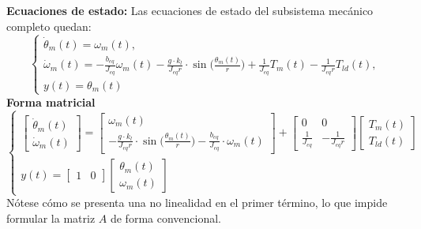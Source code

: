 \documentclass[12pt, a4paper,journal, onecolumn, compsoc]{IEEEtran}
\begin{document}
    \textbf{Ecuaciones de estado:} Las ecuaciones de estado del subsistema mecánico completo quedan:
    \begin{equation}
        \begin{cases}
            \dot \theta_m(t) = \omega_m(t), \\ 
            \dot\omega_m(t)=-\frac{b_{eq}}{J_{eq}}\omega_m(t)-\frac{g\cdot k_l}{J_{eq}r}\cdot \sin{\Big(\frac{\theta_m(t)}{r}\Big)}+\frac{1}{J_{eq}}T_m(t)-\frac{1}{J_{eq}r}T_{ld}(t),\\
            y(t)=\theta_m(t)
        \end{cases}
        \label{eq: EqEstadoModeloMecanico}
    \end{equation}
    \textbf{Forma matricial}
    \begin{equation}
        \begin{cases}
            \begin{bmatrix}
                \dot\theta_m(t) \\\dot\omega_m(t)
            \end{bmatrix}
            = 
            \begin{bmatrix}
                \omega_m(t)\\
                -\frac{g\cdot k_l}{J_{eq}r}\cdot\sin{\big(\frac{\theta_m(t)}{r}\big)}-\frac{b_{eq}}{J_{eq}}\cdot\omega_m(t)
            \end{bmatrix}
            +
            \begin{bmatrix}
                0 & 0\\
                \frac{1}{J_{eq}} &-\frac{1}{J_{eq}r}
            \end{bmatrix}
            \begin{bmatrix}
                T_m(t)\\
                T_{ld}(t)
            \end{bmatrix}\\
            y(t) = \begin{bmatrix}
                1 & 0
            \end{bmatrix}
            \begin{bmatrix}
                \theta_m(t)\\
                \omega_m(t)
            \end{bmatrix}
        \end{cases}
    \end{equation}
    Nótese cómo se presenta una no linealidad en el primer término, lo que impide formular la matriz $A$ de forma convencional.
\end{document}
